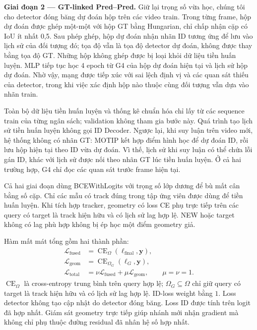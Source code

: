 \textbf{Giai đoạn 2 — GT-linked Pred–Pred.} Giữ lại trọng số vừa học, chúng tôi cho detector đóng băng dự đoán hộp trên các video train. Trong từng frame, hộp dự đoán được ghép một-một với hộp GT bằng Hungarian, chỉ chấp nhận cặp có IoU ít nhất 0,5. Sau phép ghép, hộp dự đoán nhận nhãn ID tương ứng để lưu vào lịch sử của đối tượng đó; tọa độ vẫn là tọa độ detector dự đoán, không được thay bằng tọa độ GT. Những hộp không ghép được bị loại khỏi dữ liệu tiền huấn luyện. MLP tiếp tục học 4 epoch từ G4 của hộp dự đoán hiện tại và lịch sử hộp dự đoán. Nhờ vậy, mạng được tiếp xúc với sai lệch định vị và các quan sát thiếu của detector, trong khi việc xác định hộp nào thuộc cùng đối tượng vẫn dựa vào nhãn train.

Toàn bộ dữ liệu tiền huấn luyện và thống kê chuẩn hóa chỉ lấy từ các sequence train của từng ngân sách; validation không tham gia bước này. Quá trình tạo lịch sử tiền huấn luyện không gọi ID Decoder. Ngược lại, khi suy luận trên video mới, hệ thống không có nhãn GT: MOTIP kết hợp điểm hình học để dự đoán ID, rồi lưu hộp hiện tại theo ID vừa dự đoán. Vì thế, lịch sử khi suy luận có thể chứa lỗi gán ID, khác với lịch sử được nối theo nhãn GT lúc tiền huấn luyện. Ở cả hai trường hợp, G4 chỉ đọc các quan sát trước frame hiện tại.

Cả hai giai đoạn dùng BCEWithLogits với trọng số lớp dương để bù mất cân bằng số cặp. Chỉ các mẫu có track đúng trong tập ứng viên được dùng để tiền huấn luyện. Khi tích hợp tracker, geometry có loss CE phụ trực tiếp trên các query có target là track hiện hữu và có lịch sử lag hợp lệ. NEW hoặc target không có lag phù hợp không bị ép học một điểm geometry giả.

Hàm mất mát tổng gồm hai thành phần:
\begin{equation}
 \begin{aligned}
 \mathcal L_{\mathrm{fused}}&=
    \operatorname{CE}_{\Omega}(\boldsymbol\ell_{\mathrm{final}},\mathbf y),\\
 \mathcal L_{\mathrm{geom}}&=
    \operatorname{CE}_{\Omega_G}(\boldsymbol\ell_G,\mathbf y),\\
 \mathcal L_{\mathrm{total}}&=\nu\mathcal L_{\mathrm{fused}}
                    +\mu\mathcal L_{\mathrm{geom}},\qquad\mu=\nu=1.
 \end{aligned}
 \label{eq:v3-loss}
\end{equation}
$\operatorname{CE}_{\Omega}$ là cross-entropy trung bình trên query hợp lệ;
$\Omega_G\subseteq\Omega$ chỉ giữ query có target là track hiện hữu và có
lịch sử lag hợp lệ. ID-loss weight bằng $1$. Loss detector không tạo cập nhật
do detector đóng băng. Loss ID được tính trên logit đã hợp nhất. Giám sát geometry trực tiếp
giúp nhánh mới nhận gradient mà không chỉ phụ thuộc đường residual đã nhân
hệ số hợp nhất.

